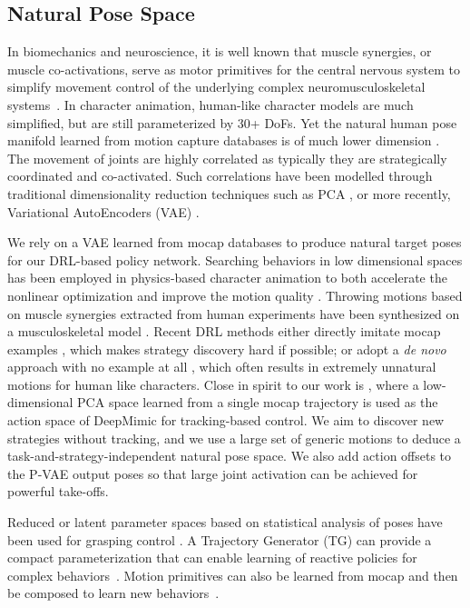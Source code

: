 \subsection{Natural Pose Space}

In biomechanics and neuroscience, it is well known that muscle synergies, or muscle co-activations, serve as motor primitives for the central nervous system to simplify movement control of the underlying complex neuromusculoskeletal systems~\cite{Overduin15,Zhao19}. In character animation, human-like character models are much simplified, but are still parameterized by 30+ DoFs. Yet the natural human pose manifold learned from motion capture databases is of much lower dimension \cite{Holden16}. The movement of joints are highly correlated as typically they are strategically coordinated and co-activated. Such correlations have been modelled through traditional dimensionality reduction techniques such as PCA \cite{chai2005performance-lowd}, or more recently, Variational AutoEncoders (VAE) \cite{habibie2017,Ling20}.

We rely on a VAE learned from mocap databases to produce natural target poses for our DRL-based policy network. Searching behaviors in low dimensional spaces has been employed in physics-based character animation to both accelerate the nonlinear optimization and improve the motion quality \cite{Safonova:2004:OptPCA}. Throwing motions based on muscle synergies extracted from human experiments have been synthesized on a musculoskeletal model \cite{cruz2017synergy}. Recent DRL methods either directly imitate mocap examples \cite{Peng:2018:DeepMimic, won2020scalable}, which makes strategy discovery hard if possible; or adopt a \textit{de novo} approach with no example at all \cite{Heess2015learning}, which often results in extremely unnatural motions for human like characters. Close in spirit to our work is \cite{ranganath2019lowd-joint-coactivation}, where a low-dimensional PCA space learned from a single mocap trajectory is used as the action space of DeepMimic for tracking-based control. We aim to discover new strategies without tracking, and we use a large set of generic motions to deduce a task-and-strategy-independent natural pose space. We also add action offsets to the P-VAE output poses so that large joint activation can be achieved for powerful take-offs.

{Reduced or latent parameter spaces based on statistical analysis of poses have been used for grasping control \cite{Ciocarlie10,Andrews13,Osa18}. A Trajectory Generator (TG) can provide a compact parameterization that can enable learning of reactive policies for complex behaviors~\cite{Iscen18}.
Motion primitives can also be learned from mocap and then be composed to learn new behaviors~\cite{Peng19}.}


